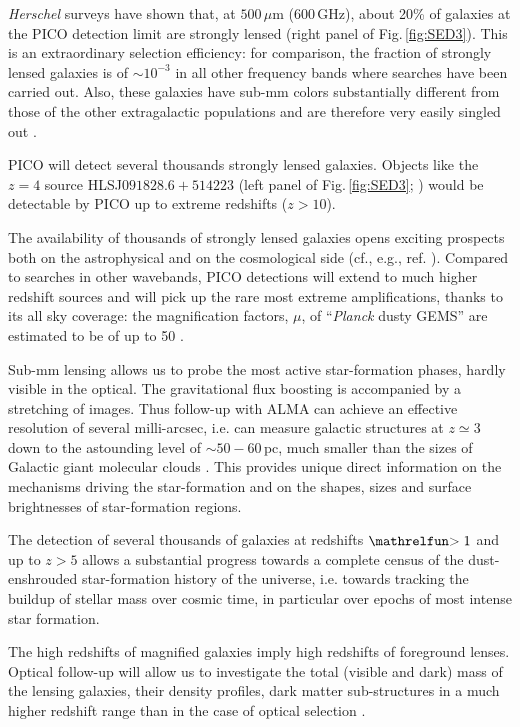 \documentclass[PICOReport.tex]{subfiles}
\begin{document}
\textit{Herschel} surveys have shown that, at $500\,\mu$m (600\,GHz), about
20\% of galaxies  at the PICO detection limit are strongly lensed (right panel
of Fig.\,\ref{fig:SED3}). This is an extraordinary selection efficiency: for
comparison, the fraction of strongly lensed galaxies is of $\sim 10^{-3}$ in
all other frequency bands where searches have been carried out. Also, these
galaxies have sub-mm colors substantially different from those of the other
extragalactic populations and are therefore very easily singled out
\cite{Negrello2017lensed}.

PICO will detect several thousands strongly lensed galaxies. Objects like the
$z=4$ source  HLSJ$091828.6+514223$ (left panel of Fig.\,\ref{fig:SED3};
\cite{Combes2012}) would be detectable by PICO up to extreme redshifts
($z>10$).

The availability of thousands of strongly lensed galaxies opens exciting
prospects both  on the astrophysical and on the cosmological side (cf., e.g.,
ref. \cite{Treu2010}). Compared to searches in other wavebands, PICO detections
will extend to much higher redshift sources \cite[most optically-selected
strongly lensed galaxies are at $z<1$, cf. Fig.\,7 of ref. ][]{Treu2010} and
will pick up the rare most extreme amplifications, thanks to its all sky
coverage: the magnification factors, $\mu$, of ``\textit{Planck} dusty GEMS''
are estimated to be of up to 50 \cite{Canameras2015}.

Sub-mm lensing allows us to probe the most active star-formation phases,
hardly visible in the optical. The gravitational flux boosting is accompanied
by a stretching of images. Thus follow-up  with ALMA can achieve an effective
resolution of several milli-arcsec, i.e. can measure galactic structures at
$z\simeq 3$ down to the astounding level of $\sim 50-60\,$pc, much smaller than
the sizes of Galactic giant molecular clouds \cite{Canameras2017ALMA}. This
provides unique direct information on the mechanisms driving the star-formation
and on the shapes, sizes and surface brightnesses of star-formation regions.

The detection of several thousands of galaxies at redshifts $\simgt 1$  and up
to $z>5$ allows a substantial progress towards a complete census of the
dust-enshrouded star-formation history of the universe, i.e. towards tracking
the buildup of stellar mass over cosmic time, in particular over epochs of most
intense star formation.

The high redshifts of magnified galaxies imply high redshifts of  foreground
lenses. Optical follow-up will allow us to investigate the total (visible and
dark) mass of the lensing galaxies, their density profiles, dark matter
sub-structures in a much higher redshift range than in the case of optical
selection \cite{Canameras2017lens}.
\end{document}
